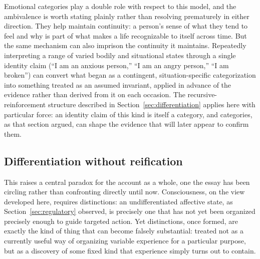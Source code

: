 \documentclass[11pt]{article}
\begin{document}
Emotional categories play a double role with respect to this model, and the ambivalence is worth stating plainly rather than resolving prematurely in either direction. They help maintain continuity: a person's sense of what they tend to feel and why is part of what makes a life recognizable to itself across time. But the same mechanism can also imprison the continuity it maintains. Repeatedly interpreting a range of varied bodily and situational states through a single identity claim (``I am an anxious person,'' ``I am an angry person,'' ``I am broken'') can convert what began as a contingent, situation-specific categorization into something treated as an assumed invariant, applied in advance of the evidence rather than derived from it on each occasion. The recursive-reinforcement structure described in Section~\ref{sec:differentiation} applies here with particular force: an identity claim of this kind is itself a category, and categories, as that section argued, can shape the evidence that will later appear to confirm them.

\subsection{Differentiation without reification}

This raises a central paradox for the account as a whole, one the essay has been circling rather than confronting directly until now. Consciousness, on the view developed here, requires distinctions: an undifferentiated affective state, as Section~\ref{sec:regulatory} observed, is precisely one that has not yet been organized precisely enough to guide targeted action. Yet distinctions, once formed, are exactly the kind of thing that can become falsely substantial: treated not as a currently useful way of organizing variable experience for a particular purpose, but as a discovery of some fixed kind that experience simply turns out to contain.
\end{document}
